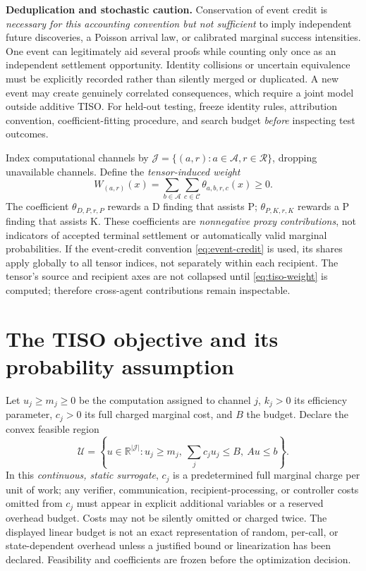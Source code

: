 \documentclass[11pt]{article}
\newcommand{\Aset}{\mathcal A}
\newcommand{\Cset}{\mathcal C}
\newcommand{\Jset}{\mathcal J}
\newcommand{\Rset}{\mathcal R}
\newcommand{\Uset}{\mathcal U}
\newcommand{\RR}{\mathbb R}
\begin{document}
\noindent\textbf{Deduplication and stochastic caution.} Conservation of event credit is \emph{necessary for this accounting convention but not sufficient} to imply independent future discoveries, a Poisson arrival law, or calibrated marginal success intensities. One event can legitimately aid several proofs while counting only once as an independent settlement opportunity. Identity collisions or uncertain equivalence must be explicitly recorded rather than silently merged or duplicated. A new event may create genuinely correlated consequences, which require a joint model outside additive TISO. For held-out testing, freeze identity rules, attribution convention, coefficient-fitting procedure, and search budget \emph{before} inspecting test outcomes.

Index computational channels by $\Jset=\{(a,r):a\in\Aset,r\in\Rset\}$, dropping unavailable channels. Define the \emph{tensor-induced weight}
\begin{equation}\label{eq:tiso-weight}
\boxed{\quad W_{(a,r)}(x)=\sum_{b\in\Aset}\sum_{c\in\Cset}\theta_{a,b,r,c}(x)\ge0.\quad}
\end{equation}
The coefficient $\theta_{D,P,r,P}$ rewards a D finding that assists P; $\theta_{P,K,r,K}$ rewards a P finding that assists K. These coefficients are \emph{nonnegative proxy contributions}, not indicators of accepted terminal settlement or automatically valid marginal probabilities. If the event-credit convention \eqref{eq:event-credit} is used, its shares apply globally to all tensor indices, not separately within each recipient. The tensor's source and recipient axes are not collapsed until \eqref{eq:tiso-weight} is computed; therefore cross-agent contributions remain inspectable.

\section{The TISO objective and its probability assumption}\label{sec:objective}
Let $u_j\ge m_j\ge0$ be the computation assigned to channel $j$, $k_j>0$ its efficiency parameter, $c_j>0$ its full charged marginal cost, and $B$ the budget. Declare the convex feasible region
\begin{equation}\label{eq:tiso-feasible}
\Uset=\left\{u\in\RR^{|\Jset|}:u_j\ge m_j,\ \sum_jc_ju_j\le B,\ Au\le b\right\}.
\end{equation}
In this \emph{continuous, static surrogate}, $c_j$ is a predetermined full marginal charge per unit of work; any verifier, communication, recipient-processing, or controller costs omitted from $c_j$ must appear in explicit additional variables or a reserved overhead budget. Costs may not be silently omitted or charged twice. The displayed linear budget is not an exact representation of random, per-call, or state-dependent overhead unless a justified bound or linearization has been declared. Feasibility and coefficients are frozen before the optimization decision.
\end{document}
